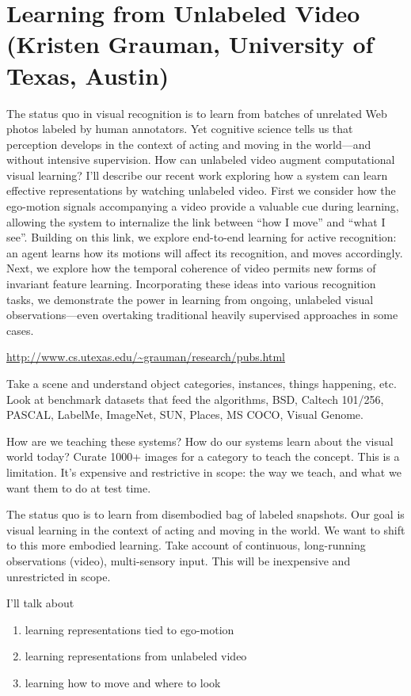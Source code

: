 \section{Learning from Unlabeled Video (Kristen Grauman, University of Texas, Austin)}

The status quo in visual recognition is to learn from batches of unrelated Web photos labeled by human annotators.  Yet cognitive science tells us that perception develops in the context of acting and moving in the world---and without intensive supervision.  How can unlabeled video augment computational visual learning?  I’ll describe our recent work exploring how a system can learn effective representations by watching unlabeled video.  First we consider how the ego-motion signals accompanying a video provide a valuable cue during learning, allowing the system to internalize the link between ``how I move'' and ``what I see''.   Building on this link, we explore end-to-end learning for active recognition: an agent learns how its motions will affect its recognition, and moves accordingly.  Next, we explore how the temporal coherence of video permits new forms of invariant feature learning.  Incorporating these ideas into various recognition tasks, we demonstrate the power in learning from ongoing, unlabeled visual observations---even overtaking traditional heavily supervised approaches in some cases.

\url{http://www.cs.utexas.edu/~grauman/research/pubs.html}

Take a scene and understand object categories, instances, things happening, etc. Look at benchmark datasets that feed the algorithms, BSD, Caltech 101/256, PASCAL, LabelMe, ImageNet, SUN, Places, MS COCO, Visual Genome.

How are we teaching these systems? How do our systems learn about the visual world today? Curate 1000+ images for a category to teach the concept. This is a limitation. It's expensive and restrictive in scope: the way we teach, and what we want them to do at test time.

The status quo is to learn from disembodied bag of labeled snapshots. Our goal is visual learning in the context of acting and moving in the world.
We want to shift to this more embodied learning.
Take account of continuous, long-running observations (video), multi-sensory input. This will be inexpensive and unrestricted in scope.

I'll talk about
\begin{enumerate}
\item
learning representations tied to ego-motion
\item
learning representations from unlabeled video
\item
learning how to move and where to look
\end{enumerate}

